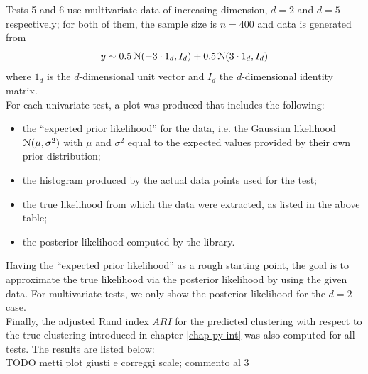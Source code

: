 Tests 5 and 6 use multivariate data of increasing dimension, $d = 2$ and $d=5$ respectively; for both of them, the sample size is $n=400$ and data is generated from
$$y \sim 0.5 \, \mathcal N(-3 \cdot 1_d, I_d) + 0.5 \, \mathcal N(3 \cdot 1_d, I_d)$$
where $1_d$ is the $d$-dimensional unit vector and $I_d$ the $d$-dimensional identity matrix. \\
For each univariate test, a plot was produced that includes the following:
\begin{itemize}
	\item the ``expected prior likelihood'' for the data, i.e. the Gaussian likelihood $\mathcal N(\mu,\sigma^2)$ with $\mu$ and $\sigma^2$ equal to the expected values provided by their own prior distribution;
	\item the histogram produced by the actual data points used for the test;
	\item the true likelihood from which the data were extracted, as listed in the above table;
	\item the posterior likelihood computed by the library.
\end{itemize}
Having the ``expected prior likelihood'' as a rough starting point, the goal is to approximate the true likelihood via the posterior likelihood by using the given data.
For multivariate tests, we only show the posterior likelihood for the $d=2$ case. \\
Finally, the adjusted Rand index $ARI$ for the predicted clustering with respect to the true clustering introduced in chapter \ref{chap-py-int} was also computed for all tests.
The results are listed below:
\\ TODO metti plot giusti e correggi scale; commento al 3 \\
